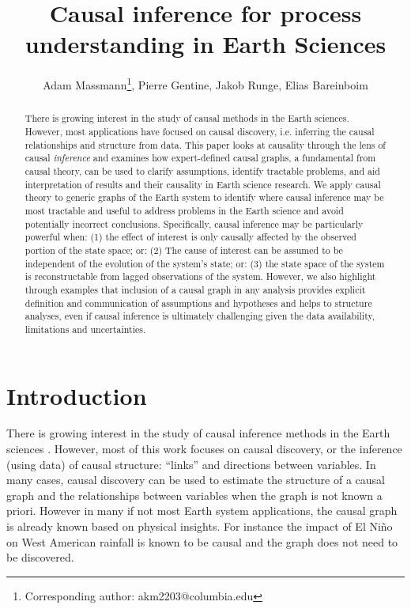 \documentclass[12pt]{article}
\begin{document}
\title{Causal inference for process understanding in Earth Sciences}

\author{Adam Massmann\thanks{Corresponding author:
    akm2203@columbia.edu}, Pierre Gentine, Jakob Runge, Elias Bareinboim}

\maketitle
\begin{abstract}
  There is growing interest in the study of causal methods in the Earth sciences. However, most applications
  have focused on causal discovery, i.e. inferring the causal
  relationships and structure from data. This paper looks at causality
  through the lens of causal {\it inference} and examines how expert-defined
  causal graphs, a fundamental from causal theory, can be used to
  clarify assumptions, identify tractable problems, and aid
  interpretation of results and their causality in Earth science research. We apply causal
  theory to generic graphs of the Earth system to identify where
  causal inference may be most tractable and useful to address
  problems in the Earth science and avoid potentially incorrect
  conclusions. Specifically, causal inference may be particularly
  powerful when: (1) the effect of
  interest is only causally affected by the observed portion of the
  state space; or: (2) The cause of interest can be assumed to be
  independent of the evolution of the system’s state; or: (3) the state space of the system is reconstructable
  from lagged observations of the system. However, we also
  highlight through examples that inclusion of a causal graph in any
  analysis provides explicit definition and communication of
  assumptions and hypotheses and helps to structure analyses, even if causal inference is ultimately challenging given the data availability, limitations and uncertainties.
\end{abstract}

\section{Introduction}

There is growing interest in the study of causal
inference methods in the Earth sciences \citep[e.g.,][]{salvucci2002,
  ebert-uphoff2012, kretschmer2016,
  samarasinghe2020,runge-causal-timeseries,runge2019inferring,goodwell-causality-2020}. However,
most of this work focuses on causal discovery, or the inference (using
data) of causal structure: ``links'' and directions between
variables. In many cases, causal discovery can be used to estimate the structure of a causal graph and the relationships between variables when the graph is
not known a priori. However in many if not most Earth system applications, the causal graph is
already known based on physical insights. For instance the impact of
El Ni\~{n}o on West American rainfall is known to be causal and the
graph does not need to be discovered.
\end{document}
